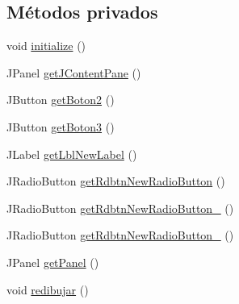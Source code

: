 \subsection*{Métodos privados}
\begin{DoxyCompactItemize}
\item 
void \mbox{\hyperlink{classgui_1_1MainGUI2_a3a26fe6d1d1f5ada994fde4258474fa8}{initialize}} ()
\item 
J\+Panel \mbox{\hyperlink{classgui_1_1MainGUI2_a3858ba493df7f97fc808f5574957a50d}{get\+J\+Content\+Pane}} ()
\item 
J\+Button \mbox{\hyperlink{classgui_1_1MainGUI2_a8d6f23df0a0e9a0ff30ee52cd96a22b5}{get\+Boton2}} ()
\item 
J\+Button \mbox{\hyperlink{classgui_1_1MainGUI2_aba8fecab1d9a5d58470104a1c15c87cc}{get\+Boton3}} ()
\item 
J\+Label \mbox{\hyperlink{classgui_1_1MainGUI2_ac7a6abf5fc9d79f2ce2098c90649d09e}{get\+Lbl\+New\+Label}} ()
\item 
J\+Radio\+Button \mbox{\hyperlink{classgui_1_1MainGUI2_aeafc590d639b886c58fc1e0a2aace47e}{get\+Rdbtn\+New\+Radio\+Button}} ()
\item 
J\+Radio\+Button \mbox{\hyperlink{classgui_1_1MainGUI2_a03b04c4b24def3ea984009b81b3f66c8}{get\+Rdbtn\+New\+Radio\+Button\+\_}} ()
\item 
J\+Radio\+Button \mbox{\hyperlink{classgui_1_1MainGUI2_a950f293a42ab4480ba95d0fd89d84eb2}{get\+Rdbtn\+New\+Radio\+Button\+\_}} ()
\item 
J\+Panel \mbox{\hyperlink{classgui_1_1MainGUI2_a952fef00d6f504abbfd9d26782da7afe}{get\+Panel}} ()
\item 
void \mbox{\hyperlink{classgui_1_1MainGUI2_a8e292a00725be416d47506409ed4fabc}{redibujar}} ()
\end{DoxyCompactItemize}
